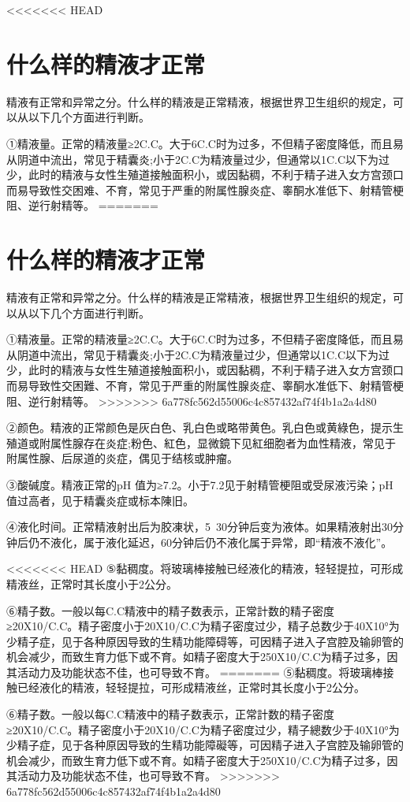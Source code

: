 \documentclass[12pt,UTF8]{ctexbook}
\begin{document}
<<<<<<< HEAD
\section{什么样的精液才正常}

精液有正常和异常之分。什么样的精液是正常精液，根据世界卫生组织的规定，可以从以下几个方面进行判断。

①精液量。正常的精液量≥2C.C。大于6C.C时为过多，不但精子密度降低，而且易从阴道中流出，常见于精囊炎;小于2C.C为精液量过少，但通常以1C.C以下为过少，此时的精液与女性生殖道接触面积小，或因黏稠，不利于精子进入女方宫颈口而易导致性交困难、不育，常见于严重的附属性腺炎症、睾酮水准低下、射精管梗阻、逆行射精等。
=======
\section{什么样的精液才正常}

精液有正常和异常之分。什么样的精液是正常精液，根据世界卫生组织的规定，可以从以下几个方面进行判断。

①精液量。正常的精液量≥2C.C。大于6C.C时为过多，不但精子密度降低，而且易从阴道中流出，常见于精囊炎;小于2C.C为精液量过少，但通常以1C.C以下为过少，此时的精液与女性生殖道接触面积小，或因黏稠，不利于精子进入女方宫颈口而易导致性交困難、不育，常见于严重的附属性腺炎症、睾酮水准低下、射精管梗阻、逆行射精等。
>>>>>>> 6a778fc562d55006c4c857432af74f4b1a2a4d80

②颜色。精液的正常颜色是灰白色、乳白色或略带黄色。乳白色或黄綠色，提示生殖道或附属性腺存在炎症;粉色、紅色，显微鏡下见紅细胞者为血性精液，常见于附属性腺、后尿道的炎症，偶见于结核或肿瘤。

③酸碱度。精液正常的pH 值为≥7.2。小于7.2见于射精管梗阻或受尿液污染；pH值过高者，见于精囊炎症或标本陳旧。

④液化时间。正常精液射出后为胶凍状，5~30分钟后变为液体。如果精液射出30分钟后仍不液化，属于液化延迟，60分钟后仍不液化属于异常，即“精液不液化”。

<<<<<<< HEAD
⑤黏稠度。将玻璃棒接触已经液化的精液，轻轻提拉，可形成精液丝，正常时其长度小于2公分。

⑥精子数。一般以每C.C精液中的精子数表示，正常計数的精子密度≥20X10/C.C。精子密度小于20X10/C.C为精子密度过少，精子总数少于40X10°为少精子症，见于各种原因导致的生精功能障碍等，可因精子进入子宫腔及输卵管的机会减少，而致生育力低下或不育。如精子密度大于250X10/C.C为精子过多，因其活动力及功能状态不佳，也可导致不育。
=======
⑤黏稠度。将玻璃棒接触已经液化的精液，轻轻提拉，可形成精液丝，正常时其长度小于2公分。

⑥精子数。一般以每C.C精液中的精子数表示，正常計数的精子密度≥20X10/C.C。精子密度小于20X10/C.C为精子密度过少，精子總数少于40X10°为少精子症，见于各种原因导致的生精功能障礙等，可因精子进入子宫腔及输卵管的机会减少，而致生育力低下或不育。如精子密度大于250X10/C.C为精子过多，因其活动力及功能状态不佳，也可导致不育。
>>>>>>> 6a778fc562d55006c4c857432af74f4b1a2a4d80
\end{document}
